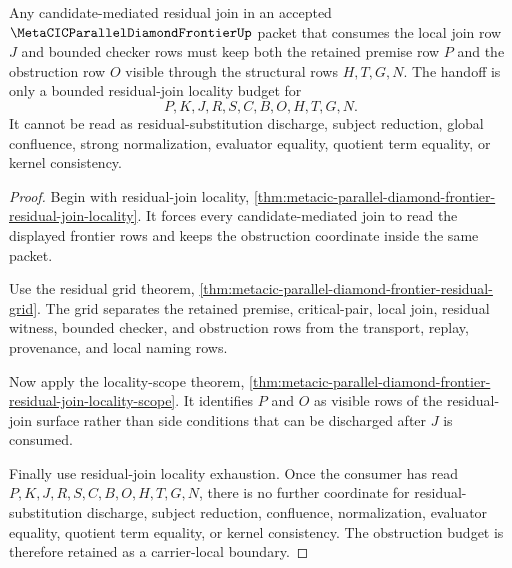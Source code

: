 \begin{theorem}
\label{thm:metacic-parallel-diamond-frontier-residual-obstruction-budget}
Any candidate-mediated residual join in an accepted $\MetaCICParallelDiamondFrontierUp$ packet that consumes the local join row $J$ and bounded checker rows must keep both the retained premise row $P$ and the obstruction row $O$ visible through the structural rows $H,T,G,N$. The handoff is only a bounded residual-join locality budget for
$$
P,K,J,R,S,C,B,O,H,T,G,N .
$$
It cannot be read as residual-substitution discharge, subject reduction, global confluence, strong normalization, evaluator equality, quotient term equality, or kernel consistency.
\end{theorem}
\begin{proof}
Begin with residual-join locality, \autoref{thm:metacic-parallel-diamond-frontier-residual-join-locality}. It forces every candidate-mediated join to read the displayed frontier rows and keeps the obstruction coordinate inside the same packet.

Use the residual grid theorem, \autoref{thm:metacic-parallel-diamond-frontier-residual-grid}. The grid separates the retained premise, critical-pair, local join, residual witness, bounded checker, and obstruction rows from the transport, replay, provenance, and local naming rows.

Now apply the locality-scope theorem, \autoref{thm:metacic-parallel-diamond-frontier-residual-join-locality-scope}. It identifies $P$ and $O$ as visible rows of the residual-join surface rather than side conditions that can be discharged after $J$ is consumed.

Finally use residual-join locality exhaustion. Once the consumer has read $P,K,J,R,S,C,B,O,H,T,G,N$, there is no further coordinate for residual-substitution discharge, subject reduction, confluence, normalization, evaluator equality, quotient term equality, or kernel consistency. The obstruction budget is therefore retained as a carrier-local boundary.
\end{proof}

